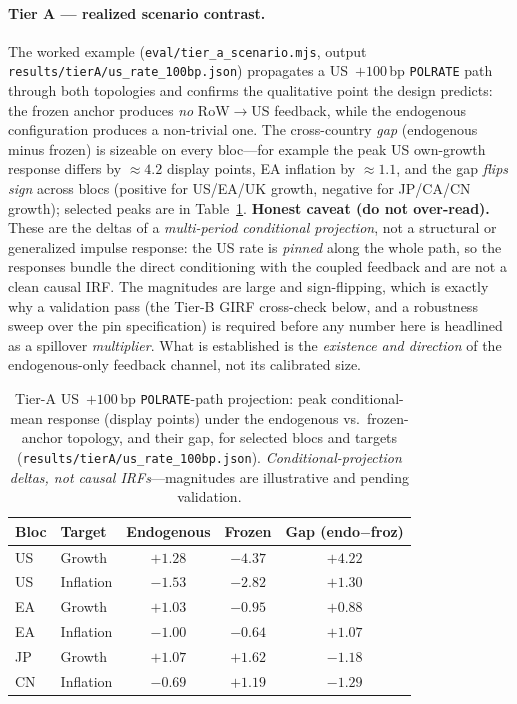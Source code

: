 \documentclass[11pt]{article}
\theoremstyle{definition}
\theoremstyle{remark}
\begin{document}
\paragraph{Tier A --- realized scenario contrast.} The worked example
(\texttt{eval/tier\_a\_scenario.mjs}, output \texttt{results/tierA/us\_rate\_100bp.json})
propagates a US~$+100$\,bp \texttt{POLRATE} path through both topologies and
confirms the qualitative point the design predicts:
the frozen anchor produces \emph{no} RoW$\to$US feedback, while the
endogenous configuration produces a non-trivial one. The cross-country
\emph{gap} (endogenous minus frozen) is sizeable on every bloc---for
example the peak US own-growth response differs by $\approx 4.2$ display
points, EA inflation by $\approx 1.1$, and the gap \emph{flips sign}
across blocs (positive for US/EA/UK growth, negative for JP/CA/CN growth);
selected peaks are in Table~\ref{tab:empirical:tierA}.
\textbf{Honest caveat (do not over-read).} These are the deltas of a
\emph{multi-period conditional projection}, not a structural or
generalized impulse response: the US rate is \emph{pinned} along the whole
path, so the responses bundle the direct conditioning with the coupled
feedback and are not a clean causal IRF. The magnitudes are large and
sign-flipping, which is exactly why a validation pass (the Tier-B GIRF
cross-check below, and a robustness sweep over the pin specification) is
required before any number here is headlined as a spillover
\emph{multiplier}. What is established is the \emph{existence and direction}
of the endogenous-only feedback channel, not its calibrated size.

\begin{table}[!ht]
\centering
\caption{Tier-A US~$+100$\,bp \texttt{POLRATE}-path projection: peak
conditional-mean response (display points) under the endogenous vs.\
frozen-anchor topology, and their gap, for selected blocs and targets
(\texttt{results/tierA/us\_rate\_100bp.json}). \emph{Conditional-projection
deltas, not causal IRFs}---magnitudes are illustrative and pending
validation.}
\label{tab:empirical:tierA}
\begin{tabular}{llccc}
\toprule
Bloc & Target & Endogenous & Frozen & Gap (endo$-$froz) \\
\midrule
US & Growth    & $+1.28$ & $-4.37$ & $+4.22$ \\
US & Inflation & $-1.53$ & $-2.82$ & $+1.30$ \\
EA & Growth    & $+1.03$ & $-0.95$ & $+0.88$ \\
EA & Inflation & $-1.00$ & $-0.64$ & $+1.07$ \\
JP & Growth    & $+1.07$ & $+1.62$ & $-1.18$ \\
CN & Inflation & $-0.69$ & $+1.19$ & $-1.29$ \\
\bottomrule
\end{tabular}
\end{table}
\end{document}
